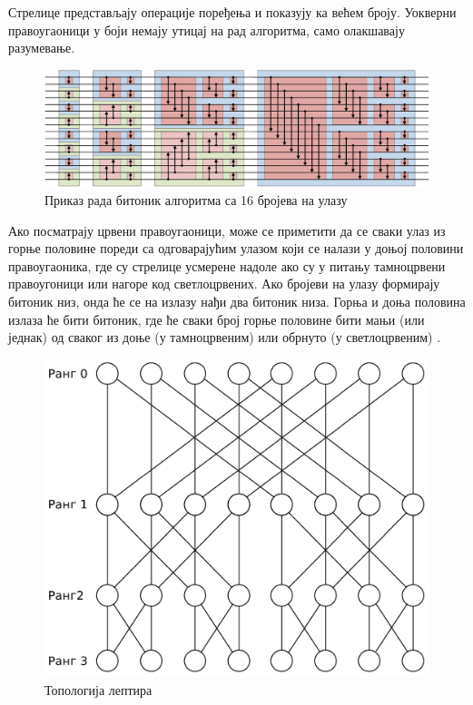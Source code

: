 \documentclass[12pt, a4paper]{article}
\theoremstyle{definition}
\begin{document}
Стрелице представљају операције поређења и показују ка већем броју. Уокверни правоугаоници у боји немају утицај на рад алгоритма, само олакшавају разумевање.
\begin{figure}[H]
  \centering
      \includegraphics[scale=0.7]{slike/BitonicSort1.pdf}
  \caption{Приказ рада битоник алгоритма са 16 бројева на улазу}
  \label{fig:bitonicSortWiki}
\end{figure}
Ако посматрају црвени правоугаоници, може се приметити да се сваки улаз из горње половине пореди са одговарајућим улазом који се налази у доњој половини правоугаоника, где су стрелице усмерене надоле ако су у питању тамноцрвени правоугоници или нагоре код светлоцрвених.
%
Ако бројеви на улазу формирају битоник низ, онда ће се на излазу нађи два битоник низа. Горња и доња половина излаза ће бити битоник, где ће сваки број горње половине бити мањи (или једнак) од сваког из доње (у тамноцрвеним) или обрнуто (у светлоцрвеним) \cite{wiki_bitonic}.
%
\begin{figure}[H]
  \centering
      \includegraphics[scale=0.25]{slike/leptir}
  \caption{Топологија лептира}
  \label{fig:leptir}
\end{figure}
\end{document}
